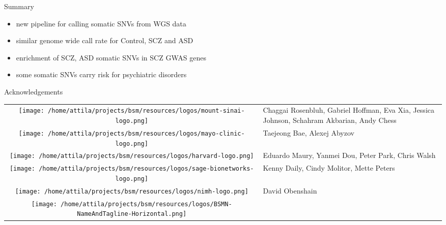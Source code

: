\documentclass[usenames,dvipsnames]{beamer}
\begin{document}
\begin{frame}{Summary}
\begin{itemize}
\item new pipeline for calling somatic SNVs from WGS data
\item similar genome wide call rate for Control, SCZ and ASD
\item enrichment of SCZ, ASD somatic SNVs in SCZ GWAS genes
\item some somatic SNVs carry risk for psychiatric disorders
\end{itemize}
\end{frame}

\begin{frame}{Acknowledgements}
\footnotesize
\begin{tabular}{cp{3in}}
\parbox[c]{9em}{\texttt{[image: /home/attila/projects/bsm/resources/logos/mount-sinai-logo.png]}}
& Chaggai Rosenbluh, Gabriel Hoffman, Eva Xia, Jessica Johnson, Schahram Akbarian, Andy Chess \\
\noalign{\medskip}
\parbox[c]{9em}{\texttt{[image: /home/attila/projects/bsm/resources/logos/mayo-clinic-logo.png]}} & Taejeong Bae, Alexej Abyzov \\
\noalign{\medskip}
\parbox[c]{9em}{\texttt{[image: /home/attila/projects/bsm/resources/logos/harvard-logo.png]}}
& Eduardo Maury, Yanmei Dou, Peter Park, Chris Walsh \\
\noalign{\medskip}
\parbox[c]{9em}{\texttt{[image: /home/attila/projects/bsm/resources/logos/sage-bionetworks-logo.png]}} & Kenny Daily, Cindy Molitor, Mette Peters \\
\noalign{\medskip}
\parbox[c]{9em}{\texttt{[image: /home/attila/projects/bsm/resources/logos/nimh-logo.png]}}
& David Obenshain \\
\noalign{\medskip}
\parbox[c]{9em}{\texttt{[image: /home/attila/projects/bsm/resources/logos/BSMN-NameAndTagline-Horizontal.png]}}
& \\
\end{tabular}
\end{frame}
\end{document}
